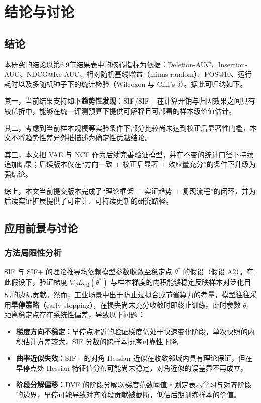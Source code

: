 
\chapter{结论与讨论}

\section{结论}
\label{sec:conclusion}

本研究的结论以第6.9节结果表中的核心指标为依据：Deletion-AUC、Insertion-AUC、NDCG@Ke-AUC、相对随机基线增益（minus-random）、POS@10、运行耗时以及多随机种子下的统计检验（Wilcoxon 与 Cliff's $\delta$）。据此可归纳如下。

其一，当前结果支持如下\textbf{趋势性发现}：SIF/SIF+ 在计算开销与归因效果之间具有较优折中，能够在统一评测预算下提供可解释且可部署的样本级价值估计。

其二，考虑到当前样本规模等实验条件下部分比较尚未达到校正后显著性门槛，本文不将趋势性差异外推描述为确定性优越结论。

其三，本文把 VAE 与 NCF 作为后续完善验证模型，并在不变的统计口径下持续追加结果；后续版本仅在“方向一致 + 校正后显著 + 效应量充分”的条件下升级为强结论。

综上，本文当前提交版本完成了“理论框架 + 实证趋势 + 复现流程”的闭环，并为后续实证扩展提供了可审计、可持续更新的研究路径。

\section{应用前景与讨论}
\label{sec:discussion}

\subsection{方法局限性分析}

SIF 与 SIF+ 的理论推导均依赖模型参数收敛至稳定点 $\theta^*$ 的假设（假设 A2）。在此假设下，验证梯度 $\nabla_\theta L_{\mathrm{val}}(\theta^*)$ 与样本梯度的内积能够稳定反映样本对泛化目标的边际贡献。然而，工业场景中出于防止过拟合或节省算力的考量，模型往往采用\textbf{早停策略}（early stopping），在损失尚未充分收敛时即终止训练。此时参数 $\theta_t$ 距离稳定点存在系统性偏差，导致以下问题：

\begin{itemize}
    \item \textbf{梯度方向不稳定：}早停点附近的验证梯度仍处于快速变化阶段，单次快照的内积估计方差较大，SIF 分数的跨样本排序可靠性下降。
    \item \textbf{曲率近似失效：}SIF+ 的对角 Hessian 近似在收敛邻域内具有理论保证，但在早停点处 Hessian 特征值分布可能尚未稳定，对角近似的误差界不再成立。
    \item \textbf{阶段分解偏移：}DVF 的阶段分解以梯度范数阈值 $\epsilon$ 划定表示学习与对齐阶段的边界，早停可能导致对齐阶段贡献被截断，低估后期训练样本的价值。
\end{itemize}

